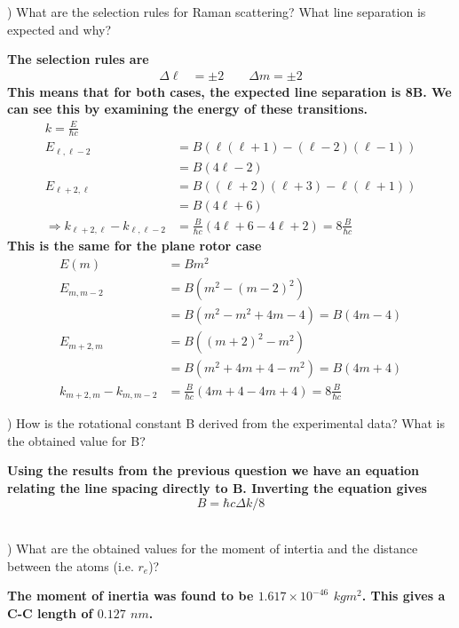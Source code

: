 \documentclass[a4paper, 11pt]{article}
\newenvironment{solution}{%
	\begin{list}{}{%
			\setlength{\topsep}{0pt}%
			\setlength{\leftmargin}{1.5cm}%
			\setlength{\rightmargin}{1.5cm}%
			\setlength{\listparindent}{\parindent}%
			\setlength{\itemindent}{\parindent}%
			\setlength{\parsep}{\parskip}%
		}%
		\item[]}{\end{list}}
\begin{document}
) What are the selection rules for Raman scattering? What line separation is expected and why?  \\
\begin{solution}\noindent\textbf{The selection rules are
    \begin{align*}
      \Delta \ell &= \pm 2 \qquad \Delta m = \pm2
    \end{align*}
    This means that for both cases, the expected line separation is 8B. We can see this by examining the energy of these transitions. 
    \begin{align*}
      k = \frac{E}{\hbar c}\\
      E_{\ell, \ell-2} &= B(\ell(\ell+1)-(\ell-2)(\ell-1)) \\
      &= B(4\ell-2) \\
      E_{\ell+2, \ell} &= B((\ell+2)(\ell+3)-\ell(\ell+1)) \\
      &= B(4\ell+6) \\
      \Rightarrow k_{\ell+2,\ell}-k_{\ell,\ell-2} &= \frac{B}{\hbar c}(4\ell+6-4\ell+2)= 8\frac{B}{\hbar c}
    \end{align*}
    This is the same for the plane rotor case
    \begin{align*}
      E(m) &= Bm^2 \\
      E_{m,m-2} &= B(m^2-(m-2)^2) \\
      &= B(m^2-m^2+4m-4) = B(4m-4)  \\
      E_{m+2, m} &= B((m+2)^2-m^2) \\
      & = B(m^2+4m+4-m^2)=B(4m+4) \\ 
      k_{m+2,m}-k_{m,m-2} &= \frac{B}{\hbar c}(4m+4-4m+4)= 8\frac{B}{\hbar c}
    \end{align*} }\end{solution}
) How is the rotational constant B derived from the experimental data? What is the obtained value for B? \\
\begin{solution}\noindent\textbf{Using the results from the previous question we have an equation relating the line spacing directly to B. Inverting the equation gives
    \begin{equation*}
      B = \hbar c \Delta k/8
      \end{equation*}\\}\end{solution}

) What are the obtained values for the moment of intertia and the distance between the atoms (i.e. $r_e$)? \\
\begin{solution}\noindent\textbf{The moment of inertia was found to be $1.617\times10^{-46}$ $kgm^2$. This gives a C-C length of $0.127$ $nm$.  \\}\end{solution}
\end{document}
